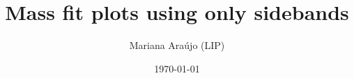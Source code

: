 \documentclass{article}
\begin{document}
\title{Mass fit plots using only sidebands}
\author{Mariana Ara\'ujo (LIP)}
\date{\today}
\maketitle


\end{document}
